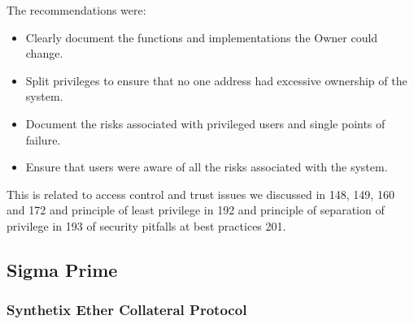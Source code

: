 The recommendations were:

\begin{itemize}
\tightlist
\item
  Clearly document the functions and implementations the Owner could
  change.
\item
  Split privileges to ensure that no one address had excessive ownership
  of the system.
\item
  Document the risks associated with privileged users and single points
  of failure.
\item
  Ensure that users were aware of all the risks associated with the
  system.
\end{itemize}

This is related to access control and trust issues we discussed in 148,
149, 160 and 172 and principle of least privilege in 192 and principle
of separation of privilege in 193 of security pitfalls at best practices
201.

\subsection{Sigma Prime}\label{sigma-prime}

\subsubsection{Synthetix Ether Collateral
Protocol}\label{synthetix-ether-collateral-protocol}


